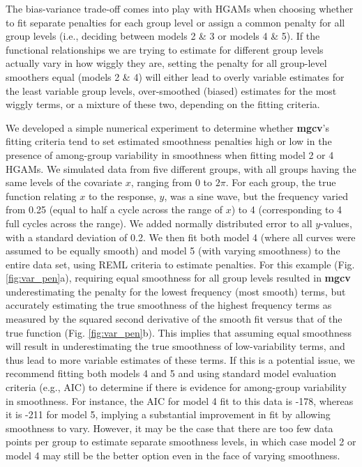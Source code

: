 \documentclass[12pt]{article}
\begin{document}
The bias-variance trade-off comes into play with HGAMs when choosing
whether to fit separate penalties for each group level or assign a
common penalty for all group levels (i.e., deciding between models 2 \&
3 or models 4 \& 5). If the functional relationships we are trying to
estimate for different group levels actually vary in how wiggly they
are, setting the penalty for all group-level smoothers equal (models 2
\& 4) will either lead to overly variable estimates for the least
variable group levels, over-smoothed (biased) estimates for the most
wiggly terms, or a mixture of these two, depending on the fitting
criteria.

We developed a simple numerical experiment to determine whether
\textbf{mgcv}'s fitting criteria tend to set estimated smoothness
penalties high or low in the presence of among-group variability in
smoothness when fitting model 2 or 4 HGAMs. We simulated data from five
different groups, with all groups having the same levels of the
covariate \(x\), ranging from 0 to \(2\pi\). For each group, the true
function relating \(x\) to the response, \(y\), was a sine wave, but the
frequency varied from 0.25 (equal to half a cycle across the range of
\(x\)) to 4 (corresponding to 4 full cycles across the range). We added
normally distributed error to all \(y\)-values, with a standard
deviation of 0.2. We then fit both model 4 (where all curves were
assumed to be equally smooth) and model 5 (with varying smoothness) to
the entire data set, using REML criteria to estimate penalties. For this
example (Fig. \ref{fig:var_pen}a), requiring equal smoothness for all
group levels resulted in \textbf{mgcv} underestimating the penalty for
the lowest frequency (most smooth) terms, but accurately estimating the
true smoothness of the highest frequency terms as measured by the
squared second derivative of the smooth fit versus that of the true
function (Fig. \ref{fig:var_pen}b). This implies that assuming equal
smoothness will result in underestimating the true smoothness of
low-variability terms, and thus lead to more variable estimates of these
terms. If this is a potential issue, we recommend fitting both models 4
and 5 and using standard model evaluation criteria (e.g., AIC) to
determine if there is evidence for among-group variability in
smoothness. For instance, the AIC for model 4 fit to this data is -178,
whereas it is -211 for model 5, implying a substantial improvement in
fit by allowing smoothness to vary. However, it may be the case that
there are too few data points per group to estimate separate smoothness
levels, in which case model 2 or model 4 may still be the better option
even in the face of varying smoothness.
\end{document}
